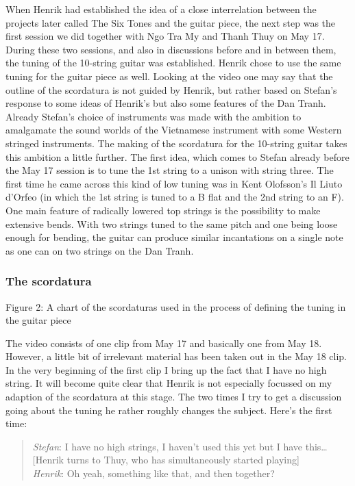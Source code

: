 When Henrik had established the idea of a close interrelation between
the projects later called The Six Tones and the guitar piece, the next
step was the first session we did together with Ngo Tra My and Thanh
Thuy on May 17. During these two sessions, and also in discussions
before and in between them, the tuning of the 10-string guitar was
established. Henrik chose to use the same tuning for the guitar piece
as well. Looking at the video one may say that the outline of the
scordatura is not guided by Henrik, but rather based on Stefan's
response to some ideas of Henrik's but also some features of the Dan
Tranh. Already Stefan's choice of instruments was made with the
ambition to amalgamate the sound worlds of the Vietnamese instrument
with some Western stringed instruments. The making of the scordatura
for the 10-string guitar takes this ambition a little further. The
first idea, which comes to Stefan already before the May 17 session is
to tune the 1st string to a unison with string three. The first time
he came across this kind of low tuning was in Kent Olofsson's Il Liuto
d'Orfeo (in which the 1st string is tuned to a B flat and the 2nd
string to an F). One main feature of radically lowered top strings is
the possibility to make extensive bends. With two strings tuned to the
same pitch and one being loose enough for bending, the guitar can
produce similar incantations on a single note as one can on two
strings on the Dan Tranh.

\subsubsection{The scordatura}
\label{sec:scordatura}


Figure 2: A chart of the scordaturas used in the process of defining the tuning in the guitar piece

The video consists of one clip from May 17 and basically one from May
18. However, a little bit of irrelevant material has been taken out in
the May 18 clip. In the very beginning of the first clip I bring up
the fact that I have no high string. It will become quite clear that
Henrik is not especially focussed on my adaption of the scordatura at
this stage. The two times I try to get a discussion going about the
tuning he rather roughly changes the subject. Here's the first time:
 
\begin{quote}
  \emph{Stefan}: I have no high strings, I haven't used this yet but I have
  this\ldots [Henrik turns to Thuy, who has simultaneously started
  playing]\\
  \emph{Henrik}: Oh yeah, something like that, and then together?
\end{quote}

